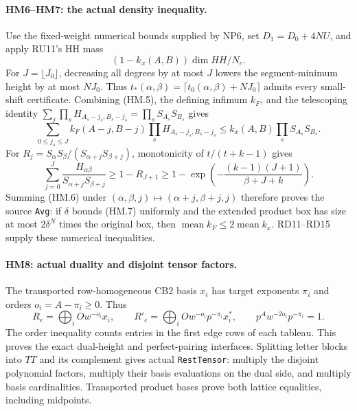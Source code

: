 \documentclass[11pt,a4paper]{article}
\numberwithin{equation}{section}
\theoremstyle{remark}\newtheorem{remark}[theorem]{Remark}
\begin{document}
\paragraph{HM6--HM7: the actual density inequality.}
Use the fixed-weight numerical bounds supplied by NP6, set
$D_1=D_0+4NU$, and apply RU11's HH mass
\[
                         (1-k_x(A,B))\dim HH/N_e.
\]
For $J=\lfloor J_0\rfloor$, decreasing all degrees by at most $J$
lowers the segment-minimum height by at most $NJ_0$.
Thus $t_*(\alpha,\beta)=\lceil t_0(\alpha,\beta)+NJ_0\rceil$
admits every small-shift certificate. Combining (HM.5), the defining
infimum $k_F$, and the telescoping identity
$\sum_j\prod_sH_{A_s-j_s,B_s-j_s}=\prod_sS_{A_s}S_{B_s}$ gives
\[
 \sum_{0\le j_s\le J} k_F(A-j,B-j)
       \prod_s H_{A_s-j_s,B_s-j_s}
 \le k_x(A,B)\prod_sS_{A_s}S_{B_s}.                    \tag{HM.6}
\]
For $R_j=S_\alpha S_\beta/(S_{\alpha+j}S_{\beta+j})$,
monotonicity of $t/(t+k-1)$ gives
\[
 \sum_{j=0}^{J}\frac{H_{\alpha\beta}}
                         {S_{\alpha+j}S_{\beta+j}}
 \ge1-R_{J+1}
 \ge1-\exp\!\left(-\frac{(k-1)(J+1)}{\beta+J+k}\right).\tag{HM.7}
\]
Summing (HM.6) under $(\alpha,\beta,j)\mapsto(\alpha+j,\beta+j,j)$
therefore proves the source \texttt{Avg}: if $\delta$ bounds (HM.7)
uniformly and the extended product box has size at most $2\delta^N$
times the original box, then $\operatorname{mean}k_F\le2\operatorname{mean}k_x$.
RD11--RD15 supply these numerical inequalities.

\paragraph{HM8: actual duality and disjoint tensor factors.}
The transported row-homogeneous CB2 basis $x_i$ has target exponents
$\pi_i$ and orders $o_i=A-\pi_i\ge0$. Thus
\[
 R_e=\bigoplus_iOw^{-o_i}x_i,\qquad
 R'_e=\bigoplus_iOw^{-o_i}p^{-\pi_i}x_i^*,\qquad
 p^Aw^{-2o_i}p^{-\pi_i}=1.                            \tag{HM.8}
\]
The order inequality counts entries in the first edge rows of each
tableau. This proves the exact dual-height and perfect-pairing interfaces.
Splitting letter blocks into $TT$ and its complement gives actual
\texttt{RestTensor}: multiply the disjoint polynomial factors, multiply
their basis evaluations on the dual side, and multiply basis cardinalities.
Transported product bases prove both lattice equalities, including midpoints.
\end{document}
